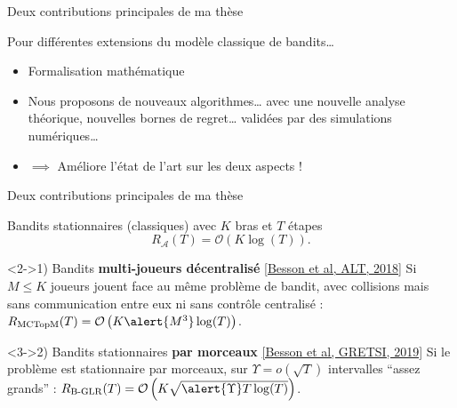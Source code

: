 \documentclass[11pt,english,ignorenonframetext,]{beamer}
\begin{document}
\begin{frame}{Deux contributions principales de ma thèse}

Pour différentes extensions du modèle classique de bandits\ldots{}

\begin{itemize}
  \item
  Formalisation mathématique
  \item
  Nous proposons de nouveaux algorithmes\ldots{}
  \newline
  avec une nouvelle analyse théorique, nouvelles bornes de regret\ldots{}
  \newline
  validées par des simulations numériques\ldots{}
  \item
  $\implies$ Améliore l'état de l'art sur les deux aspects !
\end{itemize}

\end{frame}


\begin{frame}{Deux contributions principales de ma thèse}

\begin{exampleblock}{Bandits stationnaires (classiques) avec $K$ bras et $T$ étapes}
  \[ R_{\mathcal{A}}(T) = \mathcal{O}\left( K \log(T) \right). \]
\end{exampleblock}

\begin{block}<2->{1) Bandits \textbf{multi-joueurs décentralisé} \hspace*{40pt} \href{https://arxiv.org/abs/1711.02317}{[Besson et al, ALT, 2018]}}
  Si \alert{$M \leq K$ joueurs} jouent face au même problème de bandit, \alert{avec collisions} mais sans communication entre eux ni sans contrôle centralisé :
  $R_{\mathrm{MCTopM}}(T) = \mathcal{O}\left( K \alert{M^3} \log(T) \right)$.
\end{block}

\begin{block}<3->{2) Bandits stationnaires \textbf{par morceaux} \hspace*{25pt} \href{https://arxiv.org/abs/1902.01575}{[Besson et al, GRETSI, 2019]}}
  Si le problème est \alert{stationnaire par morceaux, sur $\Upsilon = o(\sqrt{T})$ intervalles ``assez grands''} :
  $R_{\mathrm{B}\text{-}\mathrm{GLR}}(T) = \mathcal{O}\left( K \sqrt{\alert{\Upsilon} T \log(T)} \right)$.
\end{block}

\end{frame}
\end{document}
